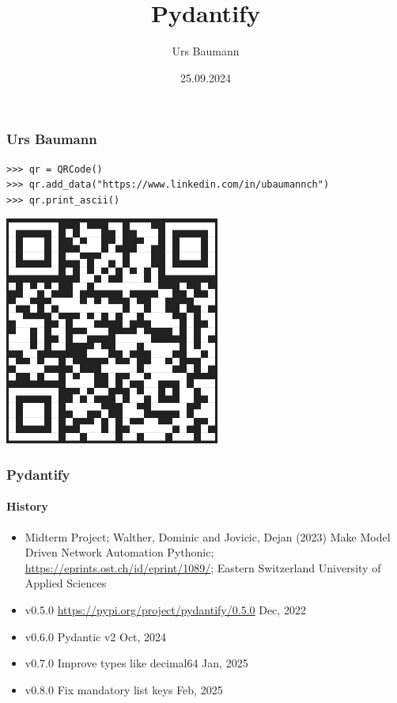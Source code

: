 \documentclass[aspectratio=169]{beamer}
\title{Pydantify}
\author{Urs Baumann}
\date{25.09.2024}
\begin{document}
{
\frame{\titlepage}
}


\begin{frame}[fragile]
  \frametitle{Urs Baumann}

  \begin{verbatim}
>>> qr = QRCode()
>>> qr.add_data("https://www.linkedin.com/in/ubaumannch")
>>> qr.print_ascii()
  \end{verbatim}

  \includegraphics[height = 0.6\textheight]{images/qrcode.png}

\end{frame}


\begin{frame}
  \frametitle{Pydantify}
  \framesubtitle{History}
  \begin{itemize}
    \setlength\itemsep{1em}
    \item Midterm Project; Walther, Dominic and Jovicic, Dejan (2023) Make Model Driven Network Automation Pythonic; \url{https://eprints.ost.ch/id/eprint/1089/}; Eastern Switzerland University of Applied Sciences
    \item v0.5.0 \url{https://pypi.org/project/pydantify/0.5.0} Dec, 2022
    \item v0.6.0 Pydantic v2 Oct, 2024
    \item v0.7.0 Improve types like decimal64 Jan, 2025
    \item v0.8.0 Fix mandatory list keys Feb, 2025
  \end{itemize}
\end{frame}
\end{document}
